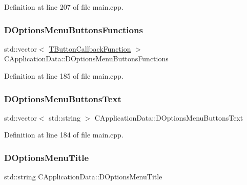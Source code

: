 Definition at line 207 of file main.\+cpp.

\hypertarget{classCApplicationData_a4c9516d20be17a9c9d5c1119736037e5}{}\label{classCApplicationData_a4c9516d20be17a9c9d5c1119736037e5} 
\subsubsection{\texorpdfstring{D\+Options\+Menu\+Buttons\+Functions}{DOptionsMenuButtonsFunctions}}
{\footnotesize\ttfamily std\+::vector$<$ \hyperlink{main_8cpp_af91bc223ea3fea871af009bfef33c595}{T\+Button\+Callback\+Function} $>$ C\+Application\+Data\+::\+D\+Options\+Menu\+Buttons\+Functions\hspace{0.3cm}{\ttfamily [protected]}}



Definition at line 185 of file main.\+cpp.

\hypertarget{classCApplicationData_aa9201da5408887973cb56fb1671ad6f8}{}\label{classCApplicationData_aa9201da5408887973cb56fb1671ad6f8} 
\subsubsection{\texorpdfstring{D\+Options\+Menu\+Buttons\+Text}{DOptionsMenuButtonsText}}
{\footnotesize\ttfamily std\+::vector$<$ std\+::string $>$ C\+Application\+Data\+::\+D\+Options\+Menu\+Buttons\+Text\hspace{0.3cm}{\ttfamily [protected]}}



Definition at line 184 of file main.\+cpp.

\hypertarget{classCApplicationData_a1e73e21e92eb68c1cfc0c4bcae8196df}{}\label{classCApplicationData_a1e73e21e92eb68c1cfc0c4bcae8196df} 
\subsubsection{\texorpdfstring{D\+Options\+Menu\+Title}{DOptionsMenuTitle}}
{\footnotesize\ttfamily std\+::string C\+Application\+Data\+::\+D\+Options\+Menu\+Title\hspace{0.3cm}{\ttfamily [protected]}}



